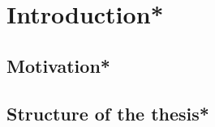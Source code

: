 
\thispagestyle{empty}


\section{Introduction*}

\subsection{Motivation*}

\subsection{Structure of the thesis*}
